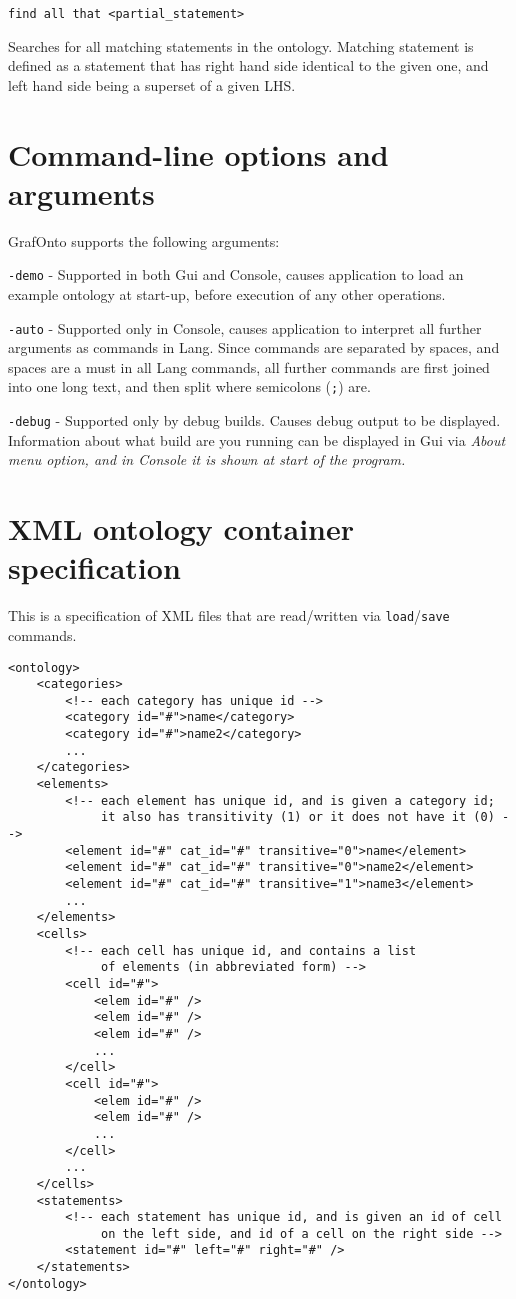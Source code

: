\documentclass{article}
\begin{document}
\begin{verbatim}
find all that <partial_statement>
\end{verbatim}
Searches for all matching statements in the ontology. Matching statement is defined as
a statement that has right hand side identical to the given one, and left hand side being 
a superset of a given LHS. 


\section{Command-line options and arguments}
GrafOnto supports the following arguments:

\verb|-demo| - Supported in both Gui and Console, causes application to load an example ontology at
start-up, before execution of any other operations.

\verb|-auto| - Supported only in Console, causes application to interpret all further arguments 
as commands in Lang. Since commands are separated by spaces, and spaces are a must in all Lang commands,
all further commands are first joined into one long text, and then split where semicolons (\verb|;|) are.

\verb|-debug| - Supported only by debug builds. Causes debug output to be displayed. Information 
about what build are you running can be 
displayed in Gui via \em About \em menu option, and in Console it is shown at start of the program.


\section{XML ontology container specification}
This is a specification of XML files that are read/written via \verb|load|/\verb|save| commands.

\begin{verbatim}
<ontology>
	<categories>
		<!-- each category has unique id -->
		<category id="#">name</category>
		<category id="#">name2</category>
		...
	</categories>
	<elements>
		<!-- each element has unique id, and is given a category id; 
		     it also has transitivity (1) or it does not have it (0) -->
		<element id="#" cat_id="#" transitive="0">name</element>
		<element id="#" cat_id="#" transitive="0">name2</element>
		<element id="#" cat_id="#" transitive="1">name3</element>
		...
	</elements>
	<cells>
		<!-- each cell has unique id, and contains a list 
		     of elements (in abbreviated form) -->
		<cell id="#">
			<elem id="#" />
			<elem id="#" />
			<elem id="#" />
			...
		</cell>
		<cell id="#">
			<elem id="#" />
			<elem id="#" />
			...
		</cell>
		...
	</cells>
	<statements>
		<!-- each statement has unique id, and is given an id of cell 
		     on the left side, and id of a cell on the right side -->
		<statement id="#" left="#" right="#" />
	</statements>
</ontology>
\end{verbatim}
\end{document}
